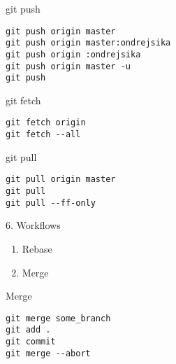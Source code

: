 \documentclass{beamer}
\begin{document}
\begin{frame}[fragile]

    {\LARGE git push}\\

    \begin{verbatim}
git push origin master
git push origin master:ondrejsika
git push origin :ondrejsika
git push origin master -u
git push
    \end{verbatim}

\end{frame}

\begin{frame}[fragile]

    {\LARGE git fetch}\\

    \begin{verbatim}
git fetch origin
git fetch --all
    \end{verbatim}

\end{frame}

\begin{frame}[fragile]

    {\LARGE git pull}\\

    \begin{verbatim}
git pull origin master
git pull
git pull --ff-only
    \end{verbatim}

\end{frame}

\begin{frame}[fragile]

    {\LARGE 6. Workflows}\\

    \begin{enumerate}
        \item Rebase
        \item Merge
    \end{enumerate}

\end{frame}

\begin{frame}[fragile]

    {\LARGE Merge}\\

    \begin{verbatim}
git merge some_branch
git add .
git commit
git merge --abort
    \end{verbatim}

\end{frame}
\end{document}
